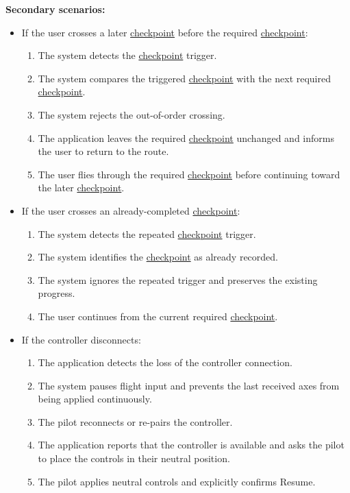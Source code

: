 \documentclass[12pt]{article}
\begin{document}
\begin{description}
\textbf{Secondary scenarios:}
\begin{itemize}
\item If the user crosses a later \hyperlink{glos:Checkpoint}{checkpoint} before the required \hyperlink{glos:Checkpoint}{checkpoint}:
\begin{enumerate}
\item The system detects the \hyperlink{glos:Checkpoint}{checkpoint} trigger.
\item The system compares the triggered \hyperlink{glos:Checkpoint}{checkpoint} with the next required
\hyperlink{glos:Checkpoint}{checkpoint}.
\item The system rejects the out-of-order crossing.
\item The application leaves the required \hyperlink{glos:Checkpoint}{checkpoint} unchanged and informs the user to
return to the route.
\item The user flies through the required \hyperlink{glos:Checkpoint}{checkpoint} before continuing toward
the later \hyperlink{glos:Checkpoint}{checkpoint}.
\end{enumerate}
\item If the user crosses an already-completed \hyperlink{glos:Checkpoint}{checkpoint}:
\begin{enumerate}
\item The system detects the repeated \hyperlink{glos:Checkpoint}{checkpoint} trigger.
\item The system identifies the \hyperlink{glos:Checkpoint}{checkpoint} as already recorded.
\item The system ignores the repeated trigger and preserves the existing progress.
\item The user continues from the current required \hyperlink{glos:Checkpoint}{checkpoint}.
\end{enumerate}
\item If the controller disconnects:
\begin{enumerate}
\item The application detects the loss of the controller connection.
\item The system pauses flight input and prevents the last received axes from being
applied continuously.
\item The pilot reconnects or re-pairs the controller.
\item The application reports that the controller is available and asks the pilot to
place the controls in their neutral position.
\item The pilot applies neutral controls and explicitly confirms Resume.

\end{enumerate}
\end{itemize}
\end{description}
\end{document}
